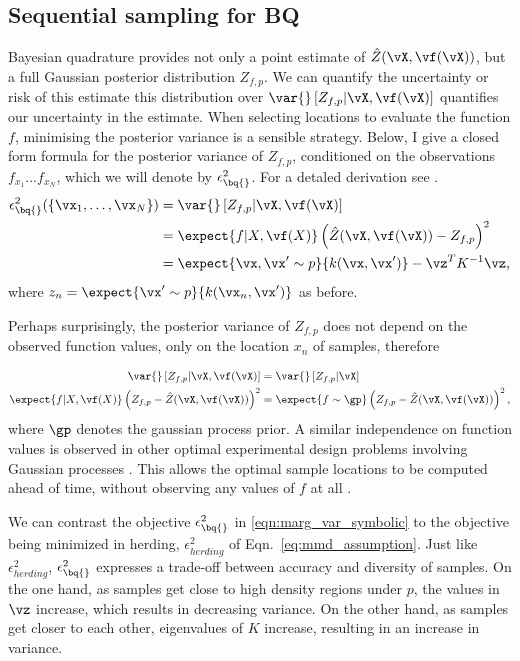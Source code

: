 \subsection{Sequential sampling for BQ}

Bayesian quadrature provides not only a point estimate of $\hat{Z}(\vX,\vf(\vX))$, but a full Gaussian posterior distribution $Z_{f,p}$. We can quantify the uncertainty or risk of this estimate this distribution over $\var{} \left[ Z_{f,p} \vert \vX, \vf(\vX) \right]$ quantifies our uncertainty in the estimate. When selecting locations to evaluate the function $f$, minimising the posterior variance is a sensible strategy. Below, I give a closed form formula for the posterior variance of $Z_{f,p}$, conditioned on the observations $f_{x_1} \dots f_{x_N}$, which we will denote by $\epsilon^2_{\bq{}}$. For a detaled derivation see \citep{BZMonteCarlo}.
\begin{align}
	\epsilon^{2}_{\bq{}}(\{ \vx_1,\ldots,\vx_N \}) &= \var{} \left[ Z_{f,p} \vert \vX, \vf(\vX) \right]\\
	&= \expect{f\vert X,\vf(X)} \left( \hat{Z}(\vX,\vf(\vX)) - Z_{f,p} \right)^2\\
	&= \expect{\vx, \vx' \sim p}{k(\vx, \vx')} - \vz^T K^{-1} \vz\mbox{,}
		\label{eqn:marg_var_symbolic}
\end{align}
%
where $z_n = \expect{\vx' \sim p}{k(\vx_n, \vx')}$ as before.

Perhaps surprisingly, the posterior variance of $Z_{f,p}$ does not depend on the observed function values, only on the location $x_n$ of samples, therefore

\begin{align}
	\var{} \left[ Z_{f,p} \vert \vX, \vf(\vX) \right] &= \var{} \left[ Z_{f,p} \vert \vX \right]\\
\expect{f\vert X,\vf(X)} \left( Z_{f,p} - \hat{Z}(\vX,\vf(\vX))  \right)^2 &= \expect{f\sim\gp} \left( Z_{f,p} - \hat{Z}(\vX,\vf(\vX)) \right)^2,\label{eqn:variance_independent}
\end{align}
%
where $\gp$ denotes the gaussian process prior. A similar independence on function values is observed in other optimal experimental design problems involving Gaussian processes \citep{Krause2006}. This allows the optimal sample locations to be computed ahead of time, without observing any values of $f$ at all \citep{minka2000dqr}.

We can contrast the \bq{} objective $\epsilon^{2}_{\bq{}}$ in \eqref{eqn:marg_var_symbolic} to the objective being minimized in herding, $\epsilon^{2}_{herding}$ of Eqn.\ \eqref{eq:mmd_assumption}. Just like $\epsilon^{2}_{herding}$, $\epsilon^{2}_{\bq{}}$ expresses a trade-off between accuracy and diversity of samples. On the one hand, as samples get close to high density regions under $p$, the values in $\vz$ increase, which results in decreasing variance. On the other hand, as samples get closer to each other, eigenvalues of $K$ increase, resulting in an increase in variance. 

